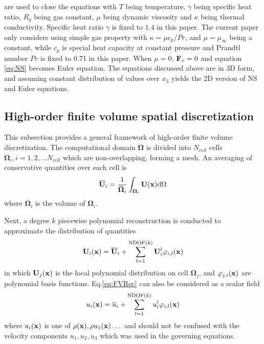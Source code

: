 \documentclass[preprint,12pt]{elsarticle}
\begin{document}
are used to close the equations
with $T$ being temperature, $\gamma$ being specific heat ratio,
$R_g$ being  gas constant, $\mu$ being dynamic viscosity and
$\kappa$ being thermal conductivity.
Specific heat ratio $\gamma$ is fixed to $1.4$ in this paper.
The current paper only
considers using simple gas property
with $\kappa = \mu c_p / Pr$,
and $\mu=\mu_{\infty}$ being a constant,
while $c_p$ is special heat capacity
at constant pressure and
Prandtl number $Pr$ is fixed to 0.71 in this paper.
When $\mu=0$,
$\mathbf{F}_v=0$ and
equation \eqref{eq:NS} becomes Euler equation.
The equations discussed above are in 3D form, and
assuming constant distribution of values over $x_3$
yields the 2D version of NS and Euler equations.

\subsection{High-order finite volume spatial discretization}
\label{ssec:FV}

\newcommand{\OO}{\mathbf{\Omega}}
\newcommand{\UM}{\overline{\U}}
\newcommand{\Fn}{\tilde{\F}}
\newcommand{\n}{\mathbf{n}}
\newcommand{\uu}{\overline{\mathbf{U}}}
\newcommand{\R}{\mathbf{R}}
\newcommand{\inc}{\mathrm\Delta}
\newcommand{\Tau}{\mathrm{T}}
\renewcommand{\real}{\mathrm{Re}}
\newcommand{\imag}{\mathrm{Im}}

\newcommand{\CFLt}{\text{CFL}_t}
\newcommand{\CFLtau}{\text{CFL}_\tau}

\newcommand{\eeqref}[1]{Eq.\eqref{#1}}
\newcommand{\us}{\mathbf{u}}


This subsection provides a general framework of
high-order
finite volume discretization.
The computational domain $\OO$ is divided
into $N_{cell}$ cells $\OO_i, i=1,2,...N_{cell}$ which
are non-overlapping, forming a mesh.
An averaging of conservative quantities
over each cell is
\begin{equation}
    \label{eq:FVMean}
    \UM_i = \frac{1}{\overline{\OO}_i}\int_{\OO_i}\U(\x)\dd \Omega
\end{equation}
where $\overline{\OO}_i$ is the volume of $\OO_i$.

Next, a degree $k$ piecewise polynomial reconstruction is
conducted to approximate the distribution of
quantities
\begin{equation}
    \label{eq:FVRec}
    \U_i(\x) = \UM_i + \sum_{l=1}^{\mathrm{NDOF}(k)}{\U_i^l\varphi_{i,l}(\x) }
\end{equation}
in which $\mathbf{U}_j(\mathbf{x})$ is the local polynomial distribution on cell $\OO_{j}$,
and
$\varphi_{j,i}(\mathbf{x})$ are
polynomial basis functions.
\eeqref{eq:FVRec} can also be considered as a scalar field
\begin{equation}
    \label{eq:FVRecScalar}
    u_i(\mathbf{x}) = \overline{u}_i + \sum_{l=1}^{\mathrm{NDOF}(k)}{u_i^l\varphi_{i,l}(\mathbf{x}) }
\end{equation}
where $u_i(\mathbf{x})$ is one of $\rho(\mathbf{x}), \rho u_1(\mathbf{x})\dots$ and should not
be confused with the velocity components $u_1, u_2, u_3$ 
which was used in the governing equations.
\end{document}

